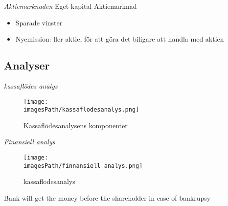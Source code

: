\documentclass{article}
\newcommand{\imagesPath}{images}
\begin{document}
\textit{Aktiemarknaden} \newline
Eget kapital Aktiemarknad
\begin{itemize}
    \item Sparade vinster 
    \item Nyemission: fler aktie, för att göra det biligare att handla med aktien
\end{itemize}

\subsection{Analyser}
\textit{kassaflödes analys}
\begin{figure}[!h]
    \centering
    \texttt{[image: \\imagesPath/kassaflodesanalys.png]}
    \caption{Kassaflödesanalysens komponenter}
\end{figure}

\textit{Finansiell analys}
\begin{figure}[!h]
    \centering
    \texttt{[image: \\imagesPath/finnansiell\_analys.png]}
    \caption{kassaflodesanalys}
\end{figure}

Bank will get the money before the shareholder in case of bankrupsy
\end{document}
